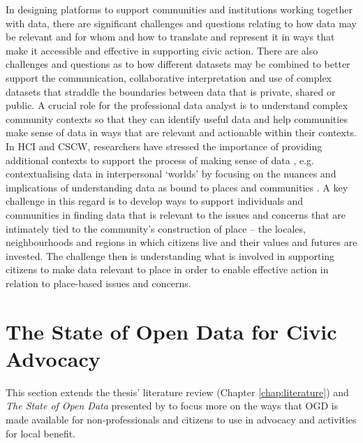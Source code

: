 In designing platforms to support communities and institutions working together with data, there are significant challenges and questions relating to how data may be relevant and for whom and how to translate and represent it in ways that make it accessible and effective in supporting civic action. There are also challenges and questions as to how different datasets may be combined to better support the communication, collaborative interpretation and use of complex datasets that straddle the boundaries between data that is private, shared or public. A crucial role for the professional data analyst is to understand complex community contexts so that they can identify useful data and help communities make sense of data in ways that are relevant and actionable within their contexts. In HCI and CSCW, researchers have stressed the importance of providing additional contexts to support the process of making sense of data \citep{disalvo_towards_2009,boehner_data_2016}, e.g. contextualising data in interpersonal `worlds' by focusing on the nuances and implications of understanding data as bound to places and communities \citep{taylor_data--place:_2015,lindley_surfacing_2017}. A key challenge in this regard is to develop ways to support individuals and communities in finding data that is relevant to the issues and concerns that are intimately tied to the community's construction of place -- the locales, neighbourhoods and regions in which citizens live and their values and futures are invested. The challenge then is understanding what is involved in supporting citizens to make data relevant to place in order to enable effective action in relation to place-based issues and concerns.

\section{The State of Open Data for Civic Advocacy}
This section extends the thesis' literature review (Chapter \ref{chap:literature}) and \textit{The State of Open Data} presented by \citet{davies_state_2019} to focus more on the ways that OGD is made available for non-professionals and citizens to use in advocacy and activities for local benefit.

